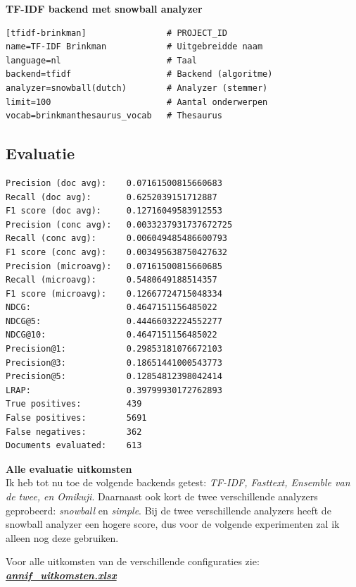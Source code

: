 \documentclass{article}
\begin{document}
\noindent
\textbf{TF-IDF backend met snowball analyzer}

\begin{lstlisting}
[tfidf-brinkman]                # PROJECT_ID
name=TF-IDF Brinkman            # Uitgebreidde naam
language=nl                     # Taal
backend=tfidf                   # Backend (algoritme)
analyzer=snowball(dutch)        # Analyzer (stemmer)
limit=100                       # Aantal onderwerpen 
vocab=brinkmanthesaurus_vocab   # Thesaurus
\end{lstlisting}

\subsection{Evaluatie}

\begin{lstlisting}
Precision (doc avg):	0.07161500815660683
Recall (doc avg):   	0.6252039151712887
F1 score (doc avg): 	0.12716049583912553
Precision (conc avg):	0.0033237931737672725
Recall (conc avg):  	0.006049485486600793
F1 score (conc avg):	0.003495638750427632
Precision (microavg):	0.07161500815660685
Recall (microavg):  	0.5480649188514357
F1 score (microavg):	0.12667724715048334
NDCG:               	0.4647151156485022
NDCG@5:             	0.44466032224552277
NDCG@10:            	0.4647151156485022
Precision@1:        	0.29853181076672103
Precision@3:        	0.18651441000543773
Precision@5:        	0.12854812398042414
LRAP:               	0.39799930172762893
True positives:     	439
False positives:    	5691
False negatives:    	362
Documents evaluated:	613
\end{lstlisting}


\noindent
\textbf{Alle evaluatie uitkomsten} \\
Ik heb tot nu toe de volgende backends getest: \textit{TF-IDF, Fasttext, Ensemble van de twee, en Omikuji}. Daarnaast ook kort de twee verschillende analyzers geprobeerd: \textit{snowball} en \textit{simple}. Bij de twee verschillende analyzers heeft de snowball analyzer een hogere score, dus voor de volgende experimenten zal ik alleen nog deze gebruiken. \\
\begin{shaded}
Voor alle uitkomsten van de verschillende configuraties zie: \href{https://github.com/KBNLresearch/Annif_data_exp/blob/master/annif_uitkomsten.xlsx}{\textbf{\textit{annif\_uitkomsten.xlsx}}}
\end{shaded}

\end{document}
